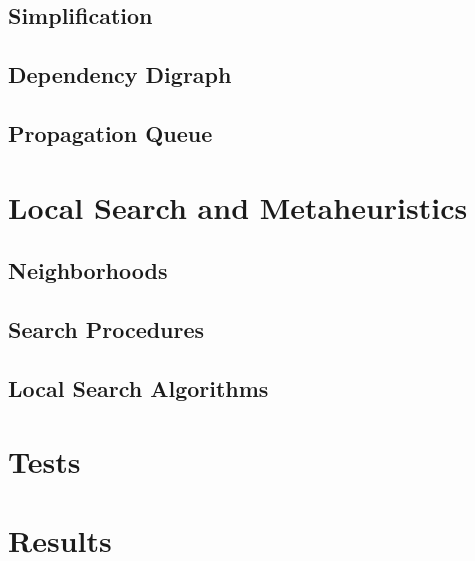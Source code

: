 \documentclass[a4paper,11pt]{article}
\begin{document}
  \subsection{Simplification}
  
  \subsection{Dependency Digraph}
     \label{sec_ddg}
  \subsection{Propagation Queue}  
    \label{sec_propaqueue}
    
  
\newpage  
%
\section{Local Search and Metaheuristics} \label{sec_local}
  
  \subsection{Neighborhoods}
  
  \subsection{Search Procedures}
  
  \subsection{Local Search Algorithms}
  
  \newpage
\section{Tests}

%
\newpage
\section{Results}
\end{document}
